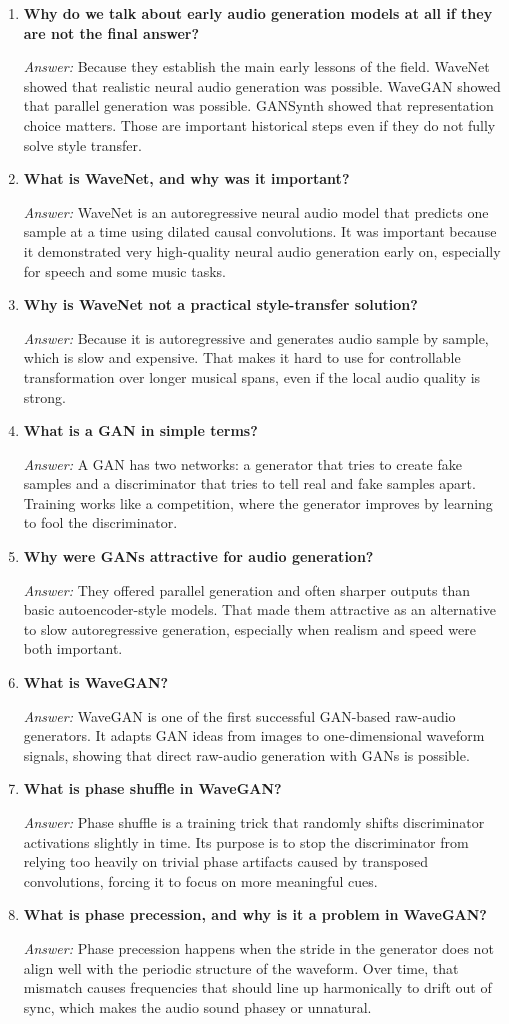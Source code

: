 \documentclass[11pt]{article}
\newcommand{\qa}[2]{
\item \textbf{#1}

\textit{Answer:} #2
}
\begin{document}
\begin{enumerate}[start=17]
\qa{Why do we talk about early audio generation models at all if they are not the final answer?}{
Because they establish the main early lessons of the field. WaveNet showed that realistic neural audio generation was possible. WaveGAN showed that parallel generation was possible. GANSynth showed that representation choice matters. Those are important historical steps even if they do not fully solve style transfer.
}

\qa{What is WaveNet, and why was it important?}{
WaveNet is an autoregressive neural audio model that predicts one sample at a time using dilated causal convolutions. It was important because it demonstrated very high-quality neural audio generation early on, especially for speech and some music tasks.
}

\qa{Why is WaveNet not a practical style-transfer solution?}{
Because it is autoregressive and generates audio sample by sample, which is slow and expensive. That makes it hard to use for controllable transformation over longer musical spans, even if the local audio quality is strong.
}

\qa{What is a GAN in simple terms?}{
A GAN has two networks: a generator that tries to create fake samples and a discriminator that tries to tell real and fake samples apart. Training works like a competition, where the generator improves by learning to fool the discriminator.
}

\qa{Why were GANs attractive for audio generation?}{
They offered parallel generation and often sharper outputs than basic autoencoder-style models. That made them attractive as an alternative to slow autoregressive generation, especially when realism and speed were both important.
}

\qa{What is WaveGAN?}{
WaveGAN is one of the first successful GAN-based raw-audio generators. It adapts GAN ideas from images to one-dimensional waveform signals, showing that direct raw-audio generation with GANs is possible.
}

\qa{What is phase shuffle in WaveGAN?}{
Phase shuffle is a training trick that randomly shifts discriminator activations slightly in time. Its purpose is to stop the discriminator from relying too heavily on trivial phase artifacts caused by transposed convolutions, forcing it to focus on more meaningful cues.
}

\qa{What is phase precession, and why is it a problem in WaveGAN?}{
Phase precession happens when the stride in the generator does not align well with the periodic structure of the waveform. Over time, that mismatch causes frequencies that should line up harmonically to drift out of sync, which makes the audio sound phasey or unnatural.
}


\end{enumerate}
\end{document}
